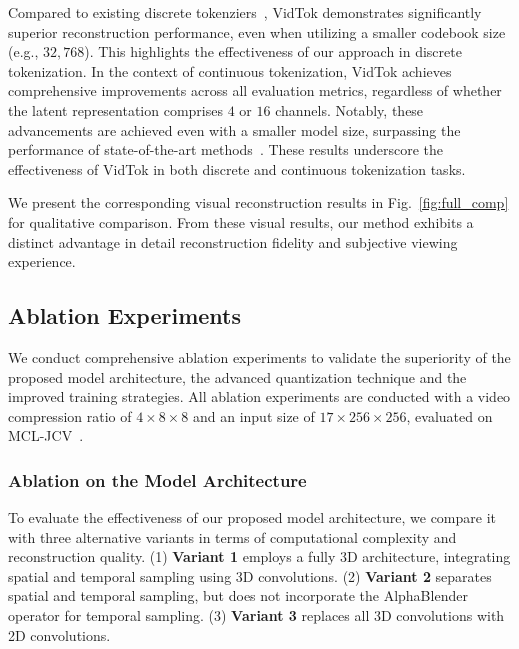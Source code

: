 \documentclass{article} %
\begin{document}
Compared to existing discrete tokenziers~\citep{yu2024language,wang2024omnitokenizer,repocosmos}, VidTok demonstrates significantly superior reconstruction performance, even when utilizing a smaller codebook size (e.g., $32,768$). This highlights the effectiveness of our approach in discrete tokenization. In the context of continuous tokenization, VidTok achieves comprehensive improvements across all evaluation metrics, regardless of whether the latent representation comprises $4$ or $16$ channels. Notably, these advancements are achieved even with a smaller model size, surpassing the performance of state-of-the-art methods~\citep{zhao2024cv,repoopensora,repoopensoraplan,yang2024cogvideox,repocosmos}. These results underscore the effectiveness of VidTok in both discrete and continuous tokenization tasks.

We present the corresponding visual reconstruction results in Fig.~\ref{fig:full_comp} for qualitative comparison. From these visual results, our method exhibits a distinct advantage in detail reconstruction fidelity and subjective viewing experience.

\subsection{Ablation Experiments}

We conduct comprehensive ablation experiments to validate the superiority of the proposed model architecture, the advanced quantization technique and the improved training strategies. All ablation experiments are conducted with a video compression ratio of $4\times 8\times 8$ and an input size of $17\times 256 \times 256$, evaluated on MCL-JCV~\citep{wang2016mcl}.

\subsubsection{Ablation on the Model Architecture}

To evaluate the effectiveness of our proposed model architecture, we compare it with three alternative variants in terms of computational complexity and reconstruction quality. (1) \textbf{Variant 1} employs a fully 3D architecture, integrating spatial and temporal sampling using 3D convolutions. (2) \textbf{Variant 2} separates spatial and temporal sampling, but does not incorporate the AlphaBlender operator for temporal sampling. (3) \textbf{Variant 3} replaces all 3D convolutions with 2D convolutions.
\end{document}
